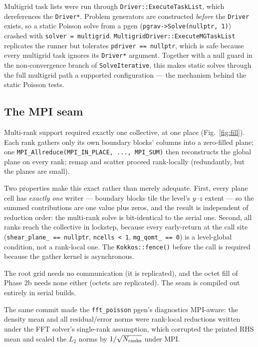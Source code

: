 \documentclass[11pt]{article}
\newcommand{\code}[1]{\texttt{#1}}
\newcommand{\file}[1]{\texttt{\small #1}}
\newcommand{\fn}[1]{\texttt{\small #1}}
\begin{document}
Multigrid task lists were run through \fn{Driver::ExecuteTaskList}, which
dereferences the \code{Driver*}. Problem generators are constructed \emph{before} the
\code{Driver} exists, so a static Poisson solve from a pgen
(\code{pgrav->Solve(nullptr, 1)}) crashed with \code{solver = multigrid}.
\fn{MultigridDriver::ExecuteMGTaskList} replicates the runner but tolerates
\code{pdriver == nullptr}, which is safe because every multigrid task ignores its
\code{Driver*} argument. Together with a null guard in the non-convergence branch of
\fn{SolveIterative}, this makes static solves through the full multigrid path a
supported configuration --- the mechanism behind the static Poisson tests.

\subsection{The MPI seam}
\label{sec:mpiseam}

Multi-rank support required exactly one collective, at one place
(Fig.~\ref{fig:fill}). Each rank gathers only its own boundary blocks' columns into a
zero-filled plane; one \code{MPI\_Allreduce(MPI\_IN\_PLACE, ..., MPI\_SUM)} then
reconstructs the global plane on every rank; remap and scatter proceed rank-locally
(redundantly, but the planes are small).

Two properties make this exact rather than merely adequate. First, every plane cell
has \emph{exactly one} writer --- boundary blocks tile the level's $y$--$z$ extent ---
so the summed contributions are one value plus zeros, and the result is independent of
reduction order: the multi-rank solve is bit-identical to the serial one. Second, all
ranks reach the collective in lockstep, because every early-return at the call site
(\code{shear\_plane\_ == nullptr}, \code{ncells < 1}, \code{mg\_qomt\_ == 0}) is a
level-global condition, not a rank-local one. The \code{Kokkos::fence()} before the
call is required because the gather kernel is asynchronous.

The root grid needs no communication (it is replicated), and the octet fill of Phase 2b
needs none either (octets are replicated). The seam is compiled out entirely in serial
builds.

The same commit made the \file{fft\_poisson} pgen's diagnostics MPI-aware: the density
mean and all residual/error norms were rank-local reductions written under the FFT
solver's single-rank assumption, which corrupted the printed RHS mean and scaled the
$L_2$ norms by $1/\sqrt{N_{\rm ranks}}$ under MPI.
\end{document}
